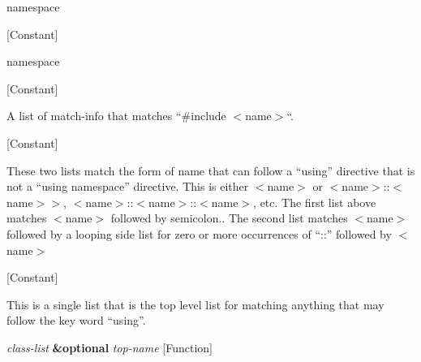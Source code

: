 \begin{doc-string}
namespace
\end{doc-string}

\vspace{1em}
\noindent
{}
\usebox{\funcname}
 \hfill [Constant]

\begin{doc-string}
namespace
\end{doc-string}

\vspace{1em}
\noindent
{}
\usebox{\funcname}
 \hfill [Constant]

\begin{doc-string}
A list of match-info that matches ``\#include $<$name$>$``.
\end{doc-string}

\vspace{1em}
\noindent
{}
\usebox{\funcname}
 \hfill [Constant]

\begin{doc-string}
These two lists match the form of name that can follow a ``using'' directive
that is not a ``using namespace'' directive.  This is either $<$name$>$ or
$<$name$>$::$<$name$>$$>$, $<$name$>$::$<$name$>$::$<$name$>$, etc.  The first list above matches
$<$name$>$ followed by semicolon..  The second list matches $<$name$>$ followed
by a looping side list for zero or more occurrences of ``::'' followed by $<$name$>$
\end{doc-string}

\vspace{1em}
\noindent
{}
\usebox{\funcname}
 \hfill [Constant]

\begin{doc-string}
This is a single list that is the top level list for matching anything
that may follow the key word ``using''.
\end{doc-string}

\vspace{1em}
\noindent
{}
\usebox{\funcname}\emph{class-list} \textbf{\&optional} \emph{top-name}
 \hfill [Function]


